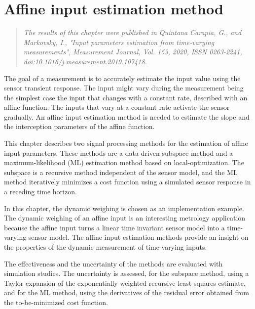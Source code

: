 

\glsresetall

\chapter{Affine input estimation method}\label{chap:AffineInput}

\begin{quote}
\emph{The results of this chapter were published in Quintana Carapia, G., and Markovsky, I.,
"Input parameters estimation from time-varying measurements", Measurement Journal, Vol. 153, 2020,
ISSN 0263-2241, doi:10.1016/j.measurement.2019.107418. \nocite{QuintanaMEAS} }\vfill{}
\end{quote}

\vfill{}


The goal of a measurement is to accurately estimate the input value using the sensor transient response.
The input might vary during the measurement being the simplest case the input that changes with a constant rate, described with an affine function.
The inputs that vary at a constant rate activate the sensor gradually. 
An affine input estimation method is needed to estimate the slope and the interception parameters of the affine function.

This chapter describes two signal processing methods for the estimation of affine input parameters.
These methods are a data-driven subspace method and a maximum-likelihood (ML) estimation method based on local-optimization.
The subspace is a recursive method independent of the sensor model, and the ML method iteratively minimizes a cost function using a simulated sensor response in a receding time horizon.

In this chapter, the dynamic weighing is chosen as an implementation example.
The dynamic weighing of an affine input is an interesting metrology application because the affine input turns a linear time invariant sensor model into a time-varying sensor model.
The affine input estimation methods provide an insight on the properties of the dynamic measurement of time-varying inputs.

The effectiveness and the uncertainty of the methods are evaluated with simulation studies.
The uncertainty is assessed, for the subspace method, using a Taylor expansion of the exponentially weighted recursive least squares estimate, and
for the ML method, using the derivatives of the residual error obtained from the to-be-minimized cost function.

